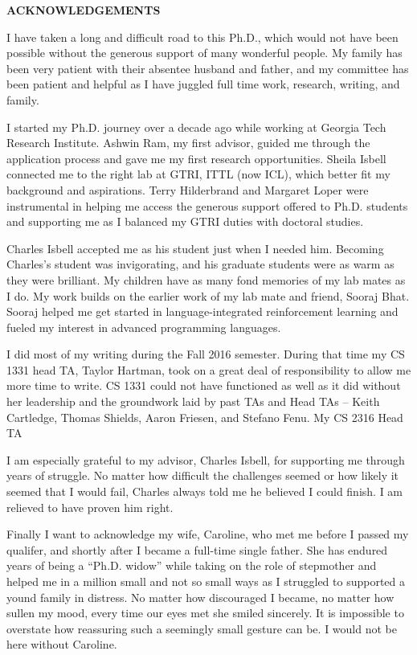 \clearpage
\begin{centering}
\textbf{ACKNOWLEDGEMENTS}\\
\vspace{\baselineskip}
\end{centering}


I have taken a long and difficult road to this Ph.D., which would not have been possible without the generous support of many wonderful people. My family has been very patient with their absentee husband and father, and my committee has been patient and helpful as I have juggled full time work, research, writing, and family.

I started my Ph.D. journey over a decade ago while working at Georgia Tech Research Institute. Ashwin Ram, my first advisor, guided me through the application process and gave me my first research opportunities. Sheila Isbell connected me to the right lab at GTRI, ITTL (now ICL), which better fit my background and aspirations. Terry Hilderbrand and Margaret Loper were instrumental in helping me access the generous support offered to Ph.D. students and supporting me as I balanced my GTRI duties with doctoral studies.

Charles Isbell accepted me as his student just when I needed him. Becoming Charles's student was invigorating, and his graduate students were as warm as they were brilliant. My children have as many fond memories of my lab mates as I do. My work builds on the earlier work of my lab mate and friend, Sooraj Bhat. Sooraj helped me get started in language-integrated reinforcement learning and fueled my interest in advanced programming languages.

I did most of my writing during the Fall 2016 semester. During that time my CS 1331 head TA, Taylor Hartman, took on a great deal of responsibility to allow me more time to write. CS 1331 could not have functioned as well as it did without her leadership and the groundwork laid by past TAs and Head TAs -- Keith Cartledge, Thomas Shields, Aaron Friesen, and Stefano Fenu. My CS 2316 Head TA

I am especially grateful to my advisor, Charles Isbell, for supporting me through years of struggle. No matter how difficult the challenges seemed or how likely it seemed that I would fail, Charles always told me he believed I could finish. I am relieved to have proven him right.

Finally I want to acknowledge my wife, Caroline, who met me before I passed my qualifer, and shortly after I became a full-time single father. She has endured years of being a ``Ph.D. widow'' while taking on the role of stepmother and helped me in a million small and not so small ways as I struggled to supported a yound family in distress. No matter how discouraged I became, no matter how sullen my mood, every time our eyes met she smiled sincerely. It is impossible to overstate how reassuring such a seemingly small gesture can be. I would not be here without Caroline.



\clearpage
